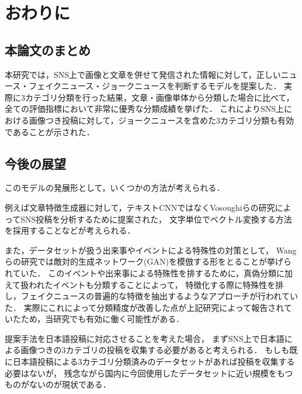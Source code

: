 %
\section{おわりに}
\label{ch:conclusion}
%
\subsection{本論文のまとめ}
本研究では，SNS上で画像と文章を併せて発信された情報に対して，正しいニュース・フェイクニュース・ジョークニュースを判断するモデルを提案した．
実際に3カテゴリ分類を行った結果，文章・画像単体から分類した場合に比べて，全ての評価指標において非常に優秀な分類成績を挙げた．
これによりSNS上における画像つき投稿に対して，ジョークニュースを含めた3カテゴリ分類も有効であることが示された．
%
\subsection{今後の展望}
このモデルの発展形として，いくつかの方法が考えられる．

例えば文章特徴生成器に対して，テキストCNNではなくVosoughiらの研究\cite{Vosoughi:2016:TLT:2911451.2914762}によってSNS投稿を分析するために提案された，
文字単位でベクトル変換する方法を採用することなどが考えられる．

また，データセットが扱う出来事やイベントによる特殊性の対策として，
Wangらの研究\cite{Wang:2018:EEA:3219819.3219903}では敵対的生成ネットワーク(GAN)を模倣する形をとることが挙げられていた．
このイベントや出来事による特殊性を排するために，真偽分類に加えて扱われたイベントも分類することによって，
特徴化する際に特殊性を排し，フェイクニュースの普遍的な特徴を抽出するようなアプローチが行われていた．
実際にこれによって分類精度が改善した点が上記研究によって報告されていたため，当研究でも有効に働く可能性がある．

提案手法を日本語投稿に対応させることを考えた場合，
まずSNS上で日本語による画像つきの3カテゴリの投稿を収集する必要があると考えられる．
もしも既に日本語投稿による3カテゴリ分類済みのデータセットがあれば投稿を収集する必要はないが，
残念ながら国内に今回使用したデータセットに近い規模をもつものがないのが現状である．

% 